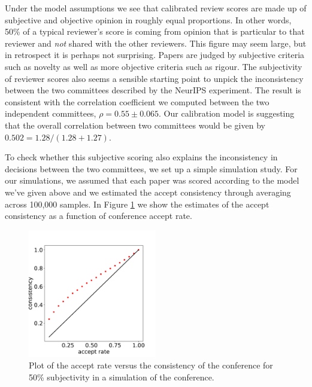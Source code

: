 \documentclass[twoside]{article}
\begin{document}
Under the model assumptions we see that calibrated review scores are made up of subjective and objective opinion in roughly equal proportions. In other words, 50\% of a typical reviewer's score is coming from opinion that is particular to that reviewer and \emph{not} shared with the other reviewers. This figure may seem large, but in retrospect it is perhaps not surprising. Papers are judged by subjective criteria such as novelty as well as more objective criteria such as rigour. The subjectivity of reviewer scores also seems a sensible starting point to unpick the inconsistency between the two committees described by the NeurIPS experiment. The result is consistent with the correlation coefficient we computed between the two independent committees, $\rho = 0.55 \pm 0.065$. Our calibration model is suggesting that the overall correlation between two committees would be given by $0.502 = 1.28/(1.28+1.27)$.

To check whether this subjective scoring also explains the inconsistency in decisions between the two committees, we set up a simple simulation study. For our simulations, we assumed that each paper was scored according to the model we've given above and we estimated the accept consistency through averaging across 100,000 samples. In Figure \ref{figure-consistency-vs-accept-rate} we show the estimates of the accept consistency as a function of conference accept rate.


\begin{figure}[htb]
\includegraphics[width=0.50\textwidth]{diagrams/neurips/consistency-vs-accept-rate.pdf}

\caption{Plot of the accept rate versus the consistency of
the conference for 50\% subjectivity in a simulation of the conference.}
\label{figure-consistency-vs-accept-rate}
\end{figure}
\end{document}
